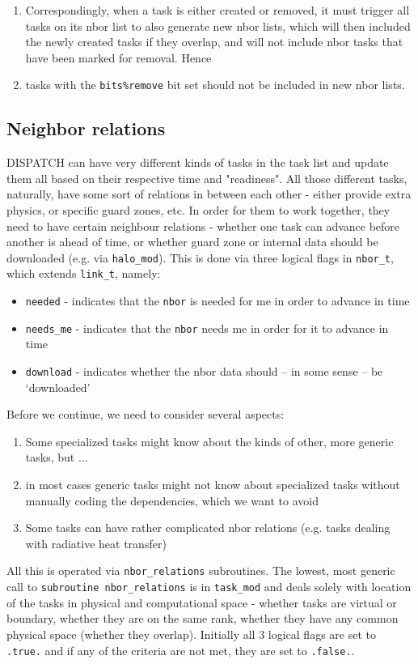 \documentclass[paper=a4,fontsize=11pt]{scrartcl}
\numberwithin{equation}{section}		%
\numberwithin{figure}{section}			%
\numberwithin{table}{section}				%
\newcommand{\codecolor}{\color{Blue}}
\newcommand{\Code}[1]{{\codecolor\texttt{#1}}}
\begin{document}
\begin{enumerate}
    \item Correspondingly, when a task is either created or removed, it must trigger all tasks on its nbor list to also generate new nbor lists, which will then included the newly created tasks if they overlap, and will not include nbor tasks that have been marked for removal.  Hence
    \item tasks with the \verb|bits%remove| bit set should not be included in new nbor lists.
\end{enumerate}

\subsection{Neighbor relations}
DISPATCH can have very different kinds of tasks in the task list and update them all based on their respective time and "readiness". All those different tasks, naturally, have some sort of relations in between each other - either provide extra physics, or specific guard zones, etc. In order for them to work together, they need to have certain neighbour relations - whether one task can advance before another is ahead of time, or whether guard zone or internal data should be downloaded (e.g. via \Code{halo\_mod}). This is done via three logical flags in \Code{nbor\_t}, which extends \Code{link\_t}, namely:
\begin{itemize}
    \item \Code{needed} - indicates that the \Code{nbor} is needed for me in order to advance in time
    \item \Code{needs\_me} - indicates that the \Code{nbor} needs me in order for it to advance in time
    \item \Code{download} - indicates whether the nbor data should -- in some sense -- be `downloaded'
\end{itemize}
Before we continue, we need to consider several aspects:
\begin{enumerate}
    \item Some specialized tasks might know about the kinds of other, more generic tasks, but ...
    \item in most cases generic tasks might not know about specialized tasks without manually coding the dependencies, which we want to avoid
    \item Some tasks can have rather complicated nbor relations (e.g. tasks dealing with radiative heat transfer)
\end{enumerate}
All this is operated via \Code{nbor\_relations} subroutines. The lowest, most generic call to \Code{subroutine nbor\_relations} is in \Code{task\_mod} and deals solely with location of the tasks in physical and computational space - whether tasks are virtual or boundary, whether they are on the same rank, whether they have any common physical space (whether they overlap). Initially all 3 logical flags are set to \Code{.true.} and if any of the criteria are not met, they are set to \Code{.false.}. 
\end{document}
